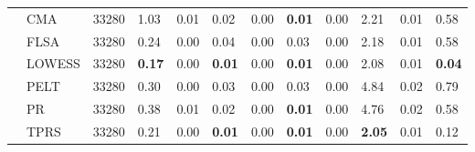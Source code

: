 \begin{table}[ht]
\begin{tabular}{llrlrlrlrlrl}
   & CMA & 33280 & 1.03 & 0.01 & 0.02 & 0.00 & \textbf{0.01} & 0.00 & 2.21 & 0.01 & 0.58 \\ 
   & FLSA & 33280 & 0.24 & 0.00 & 0.04 & 0.00 & 0.03 & 0.00 & 2.18 & 0.01 & 0.58 \\ 
   & LOWESS & 33280 & \textbf{0.17} & 0.00 & \textbf{0.01} & 0.00 & \textbf{0.01} & 0.00 & 2.08 & 0.01 & \textbf{0.04} \\ 
   & PELT & 33280 & 0.30 & 0.00 & 0.03 & 0.00 & 0.03 & 0.00 & 4.84 & 0.02 & 0.79 \\ 
   & PR & 33280 & 0.38 & 0.01 & 0.02 & 0.00 & \textbf{0.01} & 0.00 & 4.76 & 0.02 & 0.58 \\ 
   & TPRS & 33280 & 0.21 & 0.00 & \textbf{0.01} & 0.00 & \textbf{0.01} & 0.00 & \textbf{2.05} & 0.01 & 0.12 \\ 
   \bottomrule
\end{tabular}
\end{table}
